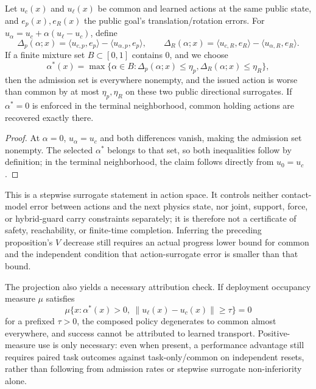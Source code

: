 \begin{proposition}
Let $u_c(x)$ and $u_\ell(x)$ be common and learned actions at the same public state,
and $e_p(x),e_R(x)$ the public goal's translation/rotation errors. For
$u_\alpha=u_c+\alpha(u_\ell-u_c)$, define
\[
 \Delta_p(\alpha;x)=
 \langle u_{c,p},e_p\rangle-\langle u_{\alpha,p},e_p\rangle,
 \qquad
 \Delta_R(\alpha;x)=
 \langle u_{c,R},e_R\rangle-\langle u_{\alpha,R},e_R\rangle.
\]
If a finite mixture set $B\subset[0,1]$ contains $0$, and we choose
\[
 \alpha^*(x)=\max\{\alpha\in B:
 \Delta_p(\alpha;x)\le\eta_p,
 \Delta_R(\alpha;x)\le\eta_R\},
\]
then the admission set is everywhere nonempty, and the issued action is worse than common by at most
$\eta_p,\eta_R$ on these two public directional surrogates. If $\alpha^*=0$ is enforced in the terminal neighborhood,
common holding actions are recovered exactly there.
\end{proposition}
\begin{proof}
At $\alpha=0$, $u_\alpha=u_c$ and both differences vanish, making the admission set nonempty.
The selected $\alpha^*$ belongs to that set, so both inequalities follow by definition; in the terminal neighborhood,
the claim follows directly from $u_0=u_c$.
\end{proof}
This is a stepwise surrogate statement in action space. It controls neither contact-model error between actions and the next physics state,
nor joint, support, force, or hybrid-guard carry constraints separately; it is therefore not a
certificate of safety, reachability, or finite-time completion. Inferring the preceding proposition's $V$ decrease still requires
an actual progress lower bound for common and the independent condition that action-surrogate error is smaller than that bound.

The projection also yields a necessary attribution check. If deployment occupancy measure $\mu$ satisfies
\[
 \mu\{x:\alpha^*(x)>0,
 \ \|u_\ell(x)-u_c(x)\|\ge\tau\}=0
\]
for a prefixed $\tau>0$, the composed policy degenerates to common almost everywhere, and success
cannot be attributed to learned transport. Positive-measure use is only necessary: even when present, a performance
advantage still requires paired task outcomes against task-only/common on independent resets, rather than following
from admission rates or stepwise surrogate non-inferiority alone.

